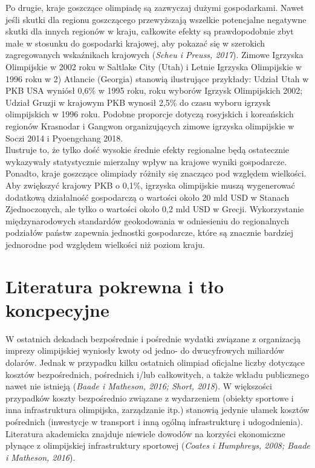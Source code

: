 \documentclass[12pt]{article}
\begin{document}
Po drugie, kraje goszczące olimpiadę są zazwyczaj dużymi gospodarkami. Nawet jeśli skutki dla regionu goszczącego przewyższają wszelkie potencjalne negatywne skutki dla innych regionów w kraju, całkowite efekty są prawdopodobnie zbyt małe w stosunku do gospodarki krajowej, aby pokazać się w szerokich zagregowanych wskaźnikach krajowych (\textit{Scheu i Preuss, 2017}). Zimowe Igrzyska Olimpijskie w 2002 roku w Saltlake City (Utah) i Letnie Igrzyska Olimpijskie w 1996 roku w 2) Atlancie (Georgia) stanowią ilustrujące przykłady: Udział Utah w PKB USA wyniósł 0,6\% w 1995 roku, roku wyborów Igrzysk Olimpijskich 2002; Udział Gruzji w krajowym PKB wynosił 2,5\% do czasu wyboru igrzysk olimpijskich w 1996 roku. Podobne proporcje dotyczą rosyjskich i koreańskich regionów Krasnodar i Gangwon organizujących zimowe igrzyska olimpijskie w Soczi 2014 i Pyoengchang 2018.\\


Ilustruje to, że tylko dość wysokie średnie efekty regionalne będą ostatecznie wykazywały statystycznie mierzalny wpływ na krajowe wyniki gospodarcze. Ponadto, kraje goszczące olimpiady różniły się znacząco pod względem wielkości. Aby zwiększyć krajowy PKB o 0,1\%, igrzyska olimpijskie muszą wygenerować dodatkową działalność gospodarczą o wartości około 20 mld USD w Stanach Zjednoczonych, ale tylko o wartości około 0,2 mld USD w Grecji. Wykorzystanie międzynarodowych standardów geokodowania w odniesieniu do regionalnych podziałów państw zapewnia jednostki gospodarcze, które są znacznie bardziej jednorodne pod względem wielkości niż poziom kraju.

\newpage        
\section{Literatura pokrewna i tło koncpecyjne}
W ostatnich dekadach bezpośrednie i pośrednie wydatki związane z organizacją imprezy olimpijskiej wyniosły kwoty od jedno- do dwucyfrowych miliardów dolarów. Jednak w przypadku kilku ostatnich olimpiad oficjalne liczby dotyczące kosztów bezpośrednich, pośrednich i/lub całkowitych, a także wkładu publicznego nawet nie istnieją (\textit{Baade i Matheson, 2016; Short, 2018}). W większości przypadków koszty bezpośrednio związane z wydarzeniem (obiekty sportowe i inna infrastruktura olimpijska, zarządzanie itp.) stanowią jedynie ułamek kosztów pośrednich (inwestycje w transport i inną ogólną infrastrukturę i udogodnienia). Literatura akademicka znajduje niewiele dowodów na korzyści ekonomiczne płynące z olimpijskiej infrastruktury sportowej (\textit{Coates i Humphreys, 2008; Baade i Matheson, 2016}).\\ 
\end{document}
